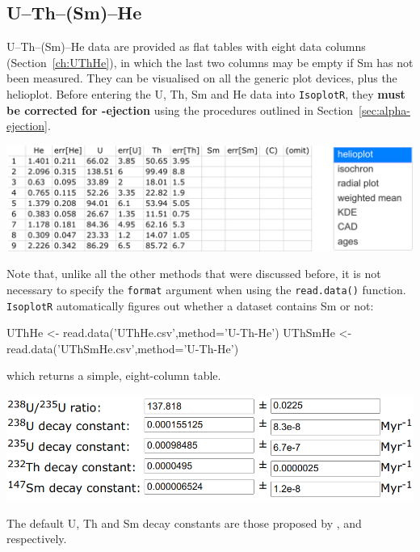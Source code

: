 \begin{refsection}

\chapter{U--Th--(Sm)--He}\label{ch:UThHe-R}

U--Th--(Sm)--He data are provided as flat tables with eight data
columns (Section~\ref{ch:UThHe}), in which the last two columns may be
empty if Sm has not been measured. They can be visualised on all the
generic plot devices, plus the helioplot. Before entering the U, Th,
Sm and He data into \texttt{IsoplotR}, they \textbf{must be corrected
  for \textalpha-ejection} using the procedures outlined in
Section~\ref{sec:alpha-ejection}.

\begin{center}
  \noindent\includegraphics[width=.9\linewidth]{../figures/UThHeInputTablePlotDevices.png}
\end{center}

Note that, unlike all the other methods that were discussed before, it
is not necessary to specify the \texttt{format} argument when using
the \texttt{read.data()} function. \texttt{IsoplotR} automatically
figures out whether a dataset contains Sm or not:

\begin{script}
UThHe <- read.data('UThHe.csv',method='U-Th-He')
UThSmHe <- read.data('UThSmHe.csv',method='U-Th-He')
\end{script}

\noindent which returns a simple, eight-column table.\\

\noindent\begin{minipage}[t]{.65\linewidth}
\strut\vspace*{-\baselineskip}\newline
\includegraphics[width=\linewidth]{../figures/UThSmHeLambda.png}
\end{minipage}
\begin{minipage}[t]{.35\linewidth}
  The default U, Th and Sm decay constants are those proposed by
  \citet{jaffey1971}, \citet{leroux1963} and \citet{villa2020}
  respectively.
\end{minipage}


\end{refsection}
